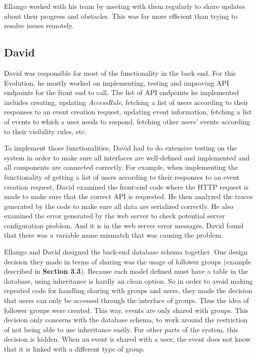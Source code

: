 \documentclass[a4paper]{article}
\begin{document}
Ellango worked with his team by meeting with them regularly to share updates about their progress and obstacles. This was far more efficient than trying to resolve issues remotely.

\subsection{David}
David was responsible for most of the functionality in the back end. For this Evolution, he mostly worked on implementing, testing and improving API endpoints for the front end to call. The list of API endpoints he implemented includes creating, updating \emph{AccessRule}, fetching a list of users according to their responses to an event creation request, updating event information, fetching a list of events to which a user needs to respond, fetching other users' events according to their visibility rules, etc.

To implement those functionalities, David had to do extensive testing on the system in order to make sure all interfaces are well-defined and implemented and all components are connected correctly. For example, when implementing the functionality of getting a list of users according to their responses to an event creation request, David examined the front-end code where the HTTP request is made to make sure that the correct API is requested. He then analyzed the traces generated by the code to make sure all data are serialized correctly. He also examined the error generated by the web server to check potential server configuration problem. And it is in the web server error messages, David found that there was a variable name mismatch that was causing the problem. 

Ellango and David designed the back-end database schema together. One design decision they made in terms of sharing was the usage of follower groups (example described in \textbf{Section 3.3}). Because each model defined must have a table in the database, using inheritance is hardly an clean option. So in order to avoid making repeated code for handling sharing with groups and users, they made the decision that users can only be accessed through the interface of groups. Thus the idea of follower groups were created. This way, events are only shared with groups. This decision only concerns with the database schema, to work around the restriction of not being able to use inheritance easily. For other parts of the system, this decision is hidden. When an event is shared with a user, the event does not know that it is linked with a different type of group.
\end{document}
